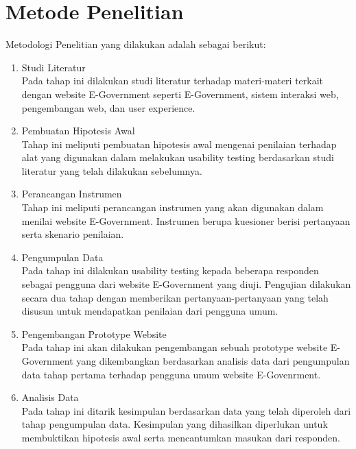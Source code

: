 \section{Metode Penelitian}
Metodologi Penelitian yang dilakukan adalah sebagai berikut:
\begin{enumerate}
	\item Studi Literatur \\
	Pada tahap ini dilakukan studi literatur terhadap materi-materi terkait dengan website E-Government seperti E-Government, sistem interaksi web, pengembangan web, dan user experience.
	\item Pembuatan Hipotesis Awal \\
	Tahap ini meliputi pembuatan hipotesis awal mengenai penilaian terhadap alat yang digunakan dalam melakukan usability testing berdasarkan studi literatur yang telah dilakukan sebelumnya.
	\item Perancangan Instrumen \\
	Tahap ini meliputi perancangan instrumen yang akan digunakan dalam menilai website E-Government. Instrumen berupa kuesioner berisi pertanyaan serta skenario penilaian.
	\item Pengumpulan Data \\
	Pada tahap ini dilakukan usability testing kepada beberapa responden sebagai pengguna dari website E-Government yang diuji. Pengujian dilakukan secara dua tahap dengan memberikan pertanyaan-pertanyaan yang telah disusun untuk mendapatkan penilaian dari pengguna umum.
	\item Pengembangan \f{Prototype} Website \\
	Pada tahap ini akan dilakukan pengembangan sebuah prototype website E-Government yang dikembangkan berdasarkan analisis data dari pengumpulan data tahap pertama terhadap pengguna umum website E-Govenrment.
	\item Analisis Data \\
	Pada tahap ini ditarik kesimpulan berdasarkan data yang telah diperoleh dari tahap pengumpulan data. Kesimpulan yang dihasilkan diperlukan untuk membuktikan hipotesis awal serta mencantumkan masukan dari responden.
\end{enumerate}
